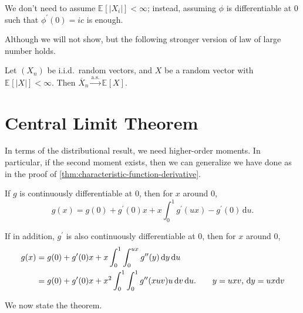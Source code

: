 \begin{remark}
	We don't need to assume \(\mathbb{E}_{}[\vert X_i \vert ] < \infty \); instead, assuming \(\phi \) is differentiable at \(0\) such that \(\phi ^{\prime} (0) = ic\) is enough.
\end{remark}

Although we will not show, but the following stronger version of law of large number holds.

\begin{theorem}\label{thm:SLLN}
	Let \((X_n)\) be i.i.d.\ random vectors, and \(X\) be a random vector with \(\mathbb{E}_{}[\vert X \vert ] < \infty \). Then \(\overline{X} _n \overset{\text{a.s.} }{\to } \mathbb{E}_{}[X] \).
\end{theorem}

\section{Central Limit Theorem}
In terms of the distributional result, we need higher-order moments. In particular, if the second moment exists, then we can generalize we have done as in the proof of \autoref{thm:characteristic-function-derivative}.

\begin{prev}
	If \(g\) is continuously differentiable at \(0\), then for \(x\) around \(0\),
	\[
		g(x)
		= g(0) + g^{\prime} (0) x + x \int_{0}^{1} g^{\prime} (ux) - g^{\prime} (0) \,\mathrm{d}u .
	\]
\end{prev}

\begin{note}\label{note:lec10}
	If in addition, \(g^{\prime} \) is also continuously differentiable at \(0\), then for \(x\) around \(0\),
	\begin{align*}
		g(x)
		 & = g(0) + g^{\prime} (0) x + x \int_{0}^{1} \int_{0}^{ux} g^{\prime\prime} (y) \,\mathrm{d}y \,\mathrm{d} u                                                               \\
		 & = g(0) + g^{\prime} (0) x + x^2 \int_{0}^{1} \int_{0}^{1} g^{\prime\prime} (xuv) u \,\mathrm{d}v \,\mathrm{d} u. \tag*{\(y = ux v\), \(\mathrm{d} y = ux \mathrm{d} v\)} \\
	\end{align*}
\end{note}

We now state the theorem.


